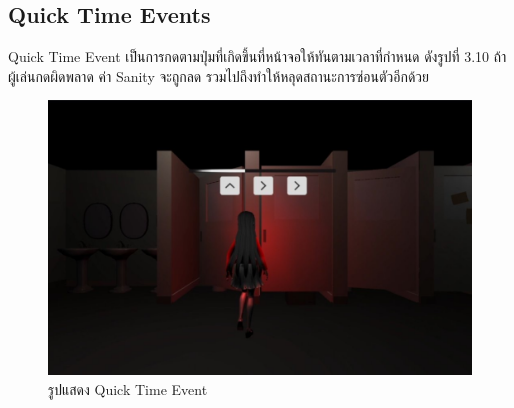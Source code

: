 \subsection{Quick Time Events}
Quick Time Event เป็นการกดตามปุ่มที่เกิดขึ้นที่หน้าจอให้ทันตามเวลาที่กำหนด ดังรูปที่ 3.10 ถ้าผู้เล่นกดผิดพลาด ค่า Sanity จะถูกลด รวมไปถึงทำให้หลุดสถานะการซ่อนตัวอีกด้วย
\begin{figure}[h]
    \centering
    \includegraphics[scale=0.15]{Images/tutorial_qte.png}
    \caption{รูปแสดง Quick Time Event}
\end{figure}


